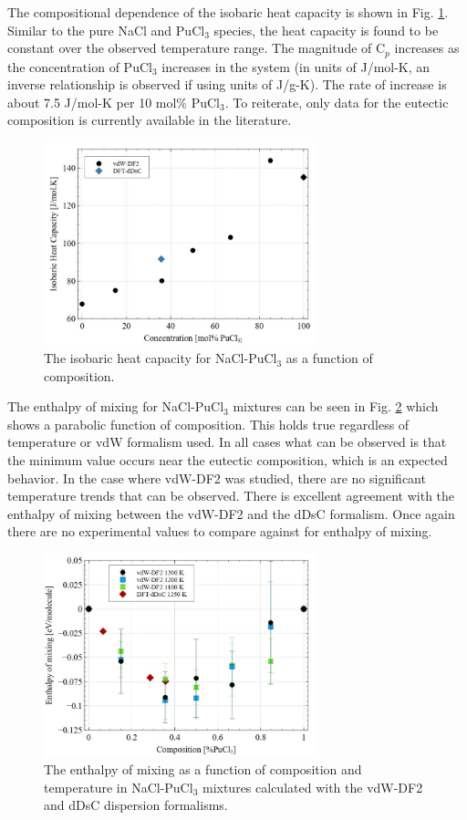 \documentclass[review]{elsarticle}
\begin{document}
The compositional dependence of the isobaric heat capacity is shown in Fig. \ref{fig:Cp}. Similar to the pure NaCl and PuCl$_3$ species, the heat capacity is found to be constant over the observed temperature range. The magnitude of C$_p$ increases as the concentration of PuCl$_3$ increases in the system (in units of J/mol-K, an inverse relationship is observed if using units of J/g-K). The rate of increase is about 7.5 J/mol-K per 10 mol\% PuCl$_3$. To reiterate, only data for the eutectic composition is currently available in the literature. 

\begin{figure}[h!]
 \centering
 \includegraphics[width=0.7\textwidth]{Cp.jpg} 
 \caption{The isobaric heat capacity for NaCl-PuCl$_3$ as a function of composition.}
 \label{fig:Cp}
\end{figure} 

The enthalpy of mixing for NaCl-PuCl$_3$ mixtures can be seen in Fig. \ref{fig:mixing} which shows a parabolic function of composition. This holds true regardless of temperature or vdW formalism used. In all cases what can be observed is that the minimum value occurs near the eutectic composition, which is an expected behavior. In the case where vdW-DF2 was studied, there are no significant temperature trends that can be observed. There is excellent agreement with the enthalpy of mixing between the vdW-DF2 and the dDsC formalism. Once again there are no experimental values to compare against for enthalpy of mixing.

\begin{figure}[h!]
 \centering
 \includegraphics[width=0.7\textwidth]{mixing.jpg} 
 \caption{The enthalpy of mixing as a function of composition and temperature in NaCl-PuCl$_3$ mixtures calculated with the vdW-DF2 and dDsC dispersion formalisms.}
 \label{fig:mixing}
\end{figure} 
\end{document}
